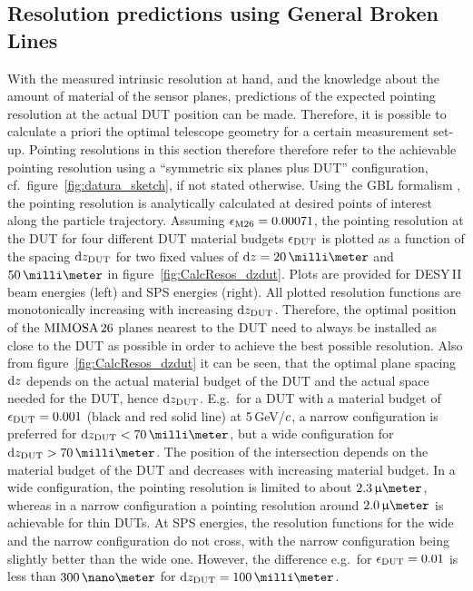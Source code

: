 \subsection{Resolution predictions using General Broken Lines}

With the measured intrinsic resolution at hand, and the knowledge about the amount of material of the sensor planes, predictions of the expected pointing resolution at the actual DUT position can be made. 
Therefore, it is possible to calculate a priori the optimal telescope geometry for a certain measurement set-up. 
Pointing resolutions in this section therefore therefore refer to the achievable pointing resolution using a ``symmetric six planes plus DUT'' configuration,
 cf.~figure~\ref{fig:datura_sketch}, if not stated otherwise.
Using the GBL formalism \cite{Kleinwort-2012,Blobel-2006}, the pointing resolution is analytically calculated at desired points of interest along the particle trajectory. 
Assuming $\mathnormal{\epsilon_{\textrm{M26}}} = 0.00071$, the pointing resolution at the DUT for four different DUT material budgets $\mathnormal{\epsilon_{\textrm{DUT}}}$ is plotted as a function of the spacing $\textrm{d}z_{\textrm{DUT}}$
 for two fixed values of $\dz = 20\,\milli\meter$ and $50\,\milli\meter$ in figure~\ref{fig:CalcResos_dzdut}. 
Plots are provided for DESY\,II beam energies (left) and SPS energies (right). 
All plotted resolution functions are monotonically increasing with increasing $\textrm{d}z_{\textrm{DUT}}$. 
Therefore, the optimal position of the $\textrm{MIMOSA\,26}$ planes nearest to the DUT need to always be installed as close to the DUT as possible in order to achieve the best possible resolution. 
Also from figure~\ref{fig:CalcResos_dzdut} it can be seen, that the optimal plane spacing $\textrm{d}z$ depends on the actual material budget of the DUT and the actual space needed for the DUT, hence $\textrm{d}z_{\textrm{DUT}}$.
E.g.~for a DUT with a material budget of $\mathnormal{\epsilon_{\textrm{DUT}}} = 0.001$ (black and red solid line) at 5\,GeV/$\mathnormal{c}$, a narrow configuration is preferred for $\dzdut < 70\,\milli\meter$,
 but a wide configuration for $\dzdut > 70\,\milli\meter$.
The position of the intersection depends on the material budget of the DUT and decreases with increasing material budget. 
In a wide configuration, the pointing resolution is limited to about $2.3\,\upmu\meter$, whereas in a narrow configuration a pointing resolution around $2.0\,\upmu\meter$ is achievable for thin DUTs.
At SPS energies, the resolution functions for the wide and the narrow configuration do not cross, with the narrow configuration being slightly better than the wide one.
However, the difference e.g.~for $\mathnormal{\epsilon_{\textrm{DUT}}} = 0.01$ is less than $300\,\nano\meter$ for $\dzdut = 100\,\milli\meter$.

